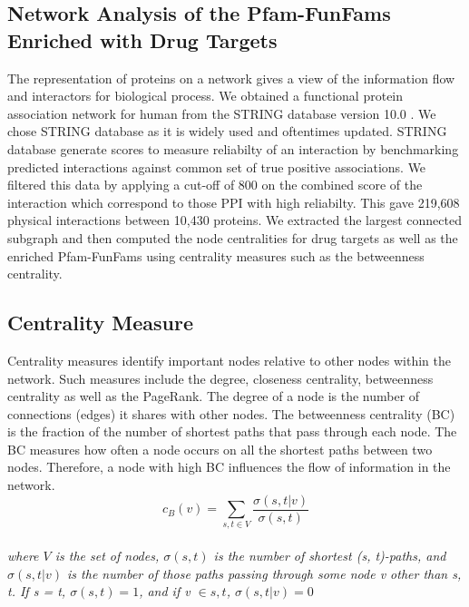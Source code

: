 \documentclass[a4paper, 11pt]{article}
\begin{document}
\subsection*{Network Analysis of the Pfam-FunFams Enriched with Drug Targets}
The representation of proteins on a network gives a view of the information flow and interactors for biological process. We obtained a functional protein association network for human from the STRING database version 10.0 \cite{szklarczyk2014string}. We chose STRING database as it is widely used and oftentimes updated. STRING database generate scores  to measure reliabilty of an interaction by benchmarking predicted interactions against common set of true positive associations. We filtered this data by applying a cut-off of 800 on the combined score of the interaction which correspond to those PPI with high reliabilty. This gave 219,608 physical interactions between 10,430 proteins. We extracted the largest connected subgraph and then computed the node centralities for drug targets as well as the enriched Pfam-FunFams using centrality measures such as the betweenness centrality.
\subsection*{Centrality Measure}
Centrality measures identify important nodes relative to other nodes within the network. Such measures include the degree, closeness centrality, betweenness centrality as well as the PageRank. The degree of a node is the number of connections (edges) it shares with other nodes. The betweenness centrality (BC) is the fraction of the number of shortest paths that pass through each node. The BC measures how often a node occurs on all the shortest paths between two nodes. Therefore, a node with high BC influences the flow of information in the network. \[c_B(v) =\sum_{s,t \in V} \frac{\sigma(s, t|v)}{\sigma(s, t)}\]\\
\textit{where $V$ is the set of nodes, $\sigma(s, t)$ is the number of shortest (s, t)-paths, and $\sigma(s, t|v)$ is the number of those paths passing through some node v other than s, t. If s = t, $\sigma(s, t) = 1$, and if v $\in {s, t}$, $\sigma(s, t|v) = 0$}
\end{document}

